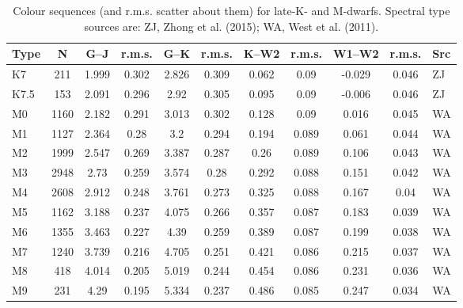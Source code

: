 \begin{table}
	\begin{tabular}{| l | c | c  c | c c | c c | c c | l |}
	\hline
	Type & N  & G--J & r.m.s. & G--K & r.m.s. & K--W2 & r.m.s. & W1--W2 & r.m.s. & Src\\
	\hline
	K7 & 211 & 1.999 & 0.302 & 2.826 & 0.309 & 0.062 & 0.09 & -0.029 & 0.046 & ZJ \\
	K7.5 & 153 & 2.091 & 0.296 & 2.92 & 0.305 & 0.095 & 0.09 & -0.006 & 0.046 & ZJ \\
	M0 & 1160 & 2.182 & 0.291 & 3.013 & 0.302 & 0.128 & 0.09 & 0.016 & 0.045 & WA \\
	M1 & 1127 & 2.364 & 0.28 & 3.2 & 0.294 & 0.194 & 0.089 & 0.061 & 0.044 & WA \\
	M2 & 1999 & 2.547 & 0.269 & 3.387 & 0.287 & 0.26 & 0.089 & 0.106 & 0.043 & WA \\
	M3 & 2948 & 2.73 & 0.259 & 3.574 & 0.28 & 0.292 & 0.088 & 0.151 & 0.042 & WA \\
	M4 & 2608 & 2.912 & 0.248 & 3.761 & 0.273 & 0.325 & 0.088 & 0.167 & 0.04 & WA \\
	M5 & 1162 & 3.188 & 0.237 & 4.075 & 0.266 & 0.357 & 0.087 & 0.183 & 0.039 & WA \\
	M6 & 1355 & 3.463 & 0.227 & 4.39 & 0.259 & 0.389 & 0.087 & 0.199 & 0.038 & WA \\
	M7 & 1240 & 3.739 & 0.216 & 4.705 & 0.251 & 0.421 & 0.086 & 0.215 & 0.037 & WA \\
	M8 & 418 & 4.014 & 0.205 & 5.019 & 0.244 & 0.454 & 0.086 & 0.231 & 0.036 & WA \\
    M9 & 231 & 4.29 & 0.195 & 5.334 & 0.237 & 0.486 & 0.085 & 0.247 & 0.034 & WA \\
	\hline
	\end{tabular}
    \caption{Colour sequences (and r.m.s. scatter about them) for late-K- and M-dwarfs. Spectral type sources are: ZJ, Zhong et al. (2015); WA, West et al. (2011).}
    \label{TabLookup}
\end{table}

